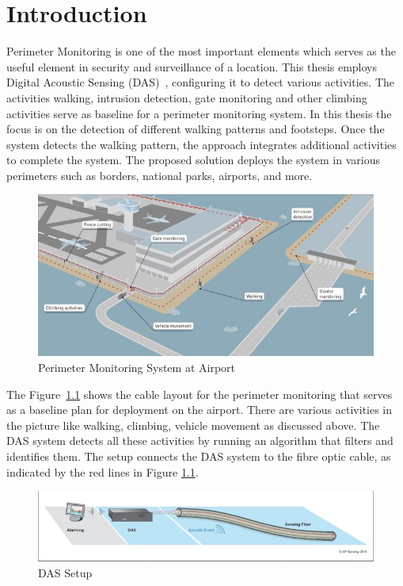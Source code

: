 %
%
%
\chapter{Introduction}
Perimeter Monitoring is one of the most important elements which serves as the useful element in security and surveillance of a location. This thesis employs Digital Acoustic Sensing (DAS)~\cite{duckworth}, configuring it to detect various activities. The activities walking, intrusion detection, gate monitoring and other climbing activities serve as baseline for a perimeter monitoring system. In this thesis the focus is on the detection of different walking patterns and footsteps. Once the system detects the walking pattern, the approach integrates additional activities to complete the system. The proposed solution deploys the system in various perimeters such as borders, national parks, airports, and more.

\begin{figure}[h]
    \centering
    \includegraphics[width=\linewidth]{Bilder/jpg/Airport.jpg}
    \caption{Perimeter Monitoring System at Airport~\cite{Airport_Image}}
    \label{Airport}
\end{figure}

The Figure~\ref{Airport} shows the cable layout for the perimeter monitoring that serves as a baseline plan for deployment on the airport. There are various activities in the picture like walking, climbing, vehicle movement as discussed above. The DAS system detects all these activities by running an algorithm that filters and identifies them. The setup connects the DAS system to the fibre optic cable, as indicated by the red lines in Figure \ref{Airport}.

\begin{figure}[h]
    \centering
    \includegraphics[width=\linewidth]{Bilder/jpg/System.jpg}
    \caption{DAS Setup~\cite{DAS_PPT}}
    \label{System}
\end{figure}

